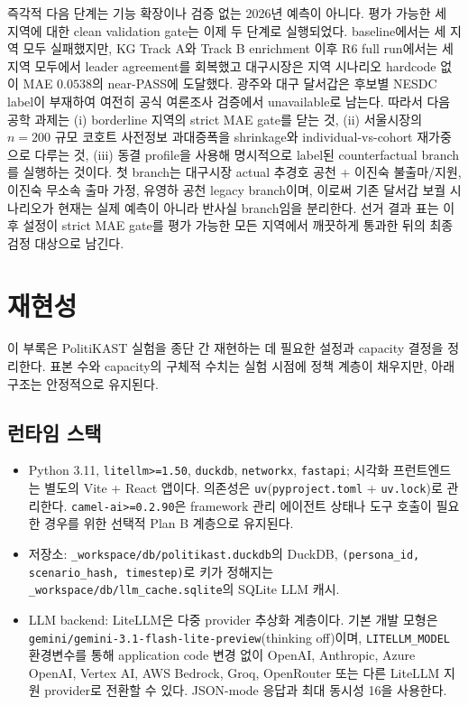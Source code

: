 \documentclass[11pt]{article}
\begin{document}
즉각적 다음 단계는 기능 확장이나 검증 없는 2026년 예측이 아니다. 평가 가능한 세 지역에 대한 clean validation gate는 이제 두 단계로 실행되었다. baseline에서는 세 지역 모두 실패했지만, KG Track A와 Track B enrichment 이후 R6 full run에서는 세 지역 모두에서 leader agreement를 회복했고 대구시장은 지역 시나리오 hardcode 없이 MAE $0.0538$의 near-PASS에 도달했다. 광주와 대구 달서갑은 후보별 NESDC label이 부재하여 여전히 공식 여론조사 검증에서 unavailable로 남는다. 따라서 다음 공학 과제는 (i) borderline 지역의 strict MAE gate를 닫는 것, (ii) 서울시장의 $n{=}200$ 규모 코호트 사전정보 과대증폭을 shrinkage와 individual-vs-cohort 재가중으로 다루는 것, (iii) 동결 profile을 사용해 명시적으로 label된 counterfactual branch를 실행하는 것이다. 첫 branch는 대구시장 actual 추경호 공천 + 이진숙 불출마/지원, 이진숙 무소속 출마 가정, 유영하 공천 legacy branch이며, 이로써 기존 달서갑 보궐 시나리오가 현재는 실제 예측이 아니라 반사실 branch임을 분리한다. 선거 결과 표는 이후 설정이 strict MAE gate를 평가 가능한 모든 지역에서 깨끗하게 통과한 뒤의 최종 검정 대상으로 남긴다.




\section{재현성}
\label{app:repro}

이 부록은 PolitiKAST 실험을 종단 간 재현하는 데 필요한 설정과 capacity 결정을 정리한다. 표본 수와 capacity의 구체적 수치는 실험 시점에 정책 계층이 채우지만, 아래 구조는 안정적으로 유지된다.

\subsection{런타임 스택}

\begin{itemize}
  \item Python 3.11, \texttt{litellm>=1.50}, \texttt{duckdb}, \texttt{networkx}, \texttt{fastapi}; 시각화 프런트엔드는 별도의 Vite + React 앱이다. 의존성은 \texttt{uv}(\texttt{pyproject.toml} + \texttt{uv.lock})로 관리한다. \texttt{camel-ai>=0.2.90}은 framework 관리 에이전트 상태나 도구 호출이 필요한 경우를 위한 선택적 Plan B 계층으로 유지된다.
  \item 저장소: \texttt{\_workspace/db/politikast.duckdb}의 DuckDB, \texttt{(persona\_id, scenario\_hash, timestep)}로 키가 정해지는 \texttt{\_workspace/db/llm\_cache.sqlite}의 SQLite LLM 캐시.
  \item LLM backend: LiteLLM은 다중 provider 추상화 계층이다. 기본 개발 모형은 \texttt{gemini/gemini-3.1-flash-lite-preview}(thinking off)이며, \texttt{LITELLM\_MODEL} 환경변수를 통해 application code 변경 없이 OpenAI, Anthropic, Azure OpenAI, Vertex AI, AWS Bedrock, Groq, OpenRouter 또는 다른 LiteLLM 지원 provider로 전환할 수 있다. JSON-mode 응답과 최대 동시성 16을 사용한다.
\end{itemize}
\end{document}
